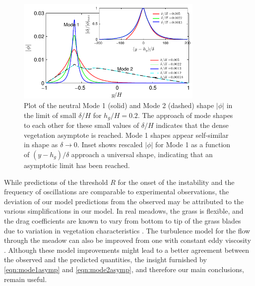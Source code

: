 \documentclass{jfm}
\newcommand{\hg}{h_g}
\renewcommand{\Rey}{{R}}
\newcommand{\Ndg}{\tilde{N}_g}
\begin{document}
\begin{figure}
\centerline{\includegraphics[width=9cm]{Asymptotic_noshear}}
\caption{
Plot of the neutral Mode 1 (solid) and Mode 2 (dashed) shape $|\phi|$ in the limit of small $\delta/H$ for $\hg/H=0.2$. 
The approach of mode shapes to each other for these small values of $\delta/H$ indicates that the dense vegetation asymptote is reached. 
Mode 1 shapes appear self-similar in shape as $\delta\to 0$.
Inset shows rescaled $|\phi|$ for Mode 1 as a function of $(y-\hg)/\delta$ approach a universal shape, indicating that an asymptotic limit has been reached. 
}
\label{Asymptotic_mode}
\end{figure}
While predictions of the threshold $\Rey$ for the onset of the instability and the frequency of oscillations are comparable to experimental observations, the deviation of our model predictions from the observed may be attributed to the various simplifications in our model. 
In real meadows, the grass is flexible, and the drag coefficients are known to vary from bottom to tip of the grass blades due to variation in vegetation characteristics \citep{Vivoni98,Nepf00}. 
The turbulence model for the flow through the meadow can also be improved from one with constant eddy viscosity \citep{Ghisal02, Nepf04}. 
Although these model improvements might lead to a better agreement between the observed and the predicted quantities, the insight furnished by \eqref{eqn:mode1asymp} and \eqref{eqn:mode2asymp}, and therefore our main conclusions, remain useful.
\end{document}
